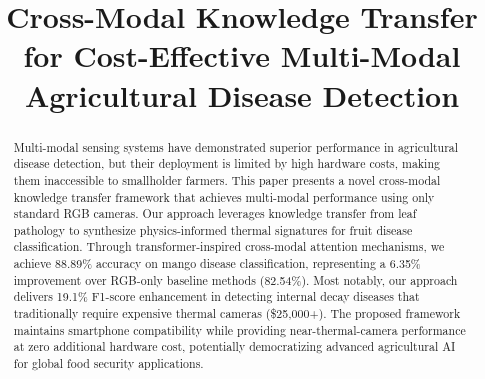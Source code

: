 \documentclass[conference]{IEEEtran}
\begin{document}
\title{Cross-Modal Knowledge Transfer for Cost-Effective Multi-Modal Agricultural Disease Detection}

\author{
    \and
    \and
    \and
}

\maketitle

\begin{abstract}
    Multi-modal sensing systems have demonstrated superior performance in agricultural disease detection, but their deployment is limited by high hardware costs, making them inaccessible to smallholder farmers. This paper presents a novel cross-modal knowledge transfer framework that achieves multi-modal performance using only standard RGB cameras. Our approach leverages knowledge transfer from leaf pathology to synthesize physics-informed thermal signatures for fruit disease classification. Through transformer-inspired cross-modal attention mechanisms, we achieve 88.89\% accuracy on mango disease classification, representing a 6.35\% improvement over RGB-only baseline methods (82.54\%). Most notably, our approach delivers 19.1\% F1-score enhancement in detecting internal decay diseases that traditionally require expensive thermal cameras (\$25,000+). The proposed framework maintains smartphone compatibility while providing near-thermal-camera performance at zero additional hardware cost, potentially democratizing advanced agricultural AI for global food security applications.
\end{abstract}
\end{document}
